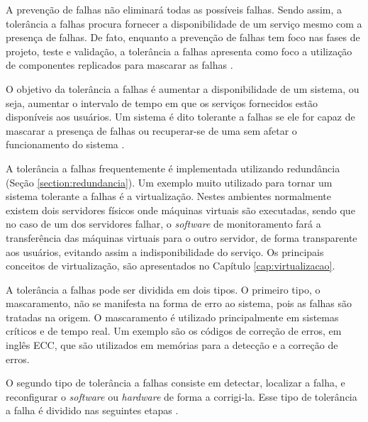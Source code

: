 A prevenção de falhas não eliminará todas as possíveis falhas. Sendo assim, a tolerância a falhas procura fornecer a disponibilidade de 
um serviço mesmo com a presença de falhas. De fato, enquanto a prevenção de falhas tem foco nas fases de projeto, teste e validação, a 
tolerância a falhas apresenta como foco a utilização de componentes replicados para mascarar as falhas \cite{pankaj1994}.

O objetivo da tolerância a falhas é aumentar a disponibilidade de um sistema, ou seja, aumentar o intervalo de tempo em que os serviços 
fornecidos estão disponíveis aos usuários. Um sistema é dito tolerante a falhas se ele for capaz de mascarar a presença de falhas ou recuperar-se 
de uma sem afetar o funcionamento do sistema \cite{pankaj1994}. %

A tolerância a falhas frequentemente é implementada utilizando redundância (Seção \ref{section:redundancia}). 
Um exemplo muito utilizado para tornar um sistema tolerante a falhas é a virtualização. Nestes ambientes normalmente existem dois servidores 
físicos onde máquinas virtuais são executadas, sendo que no caso de um dos servidores falhar, o \textit{software} de monitoramento fará a 
transferência das máquinas virtuais para o outro servidor, de forma transparente aos usuários, evitando assim a indisponibilidade do serviço. 
Os principais conceitos de virtualização, são apresentados no Capítulo \ref{cap:virtualizacao}.

A tolerância a falhas pode ser dividida em dois tipos. O primeiro tipo, o mascaramento, não se manifesta na forma de erro ao sistema, 
pois as falhas são tratadas na origem. O mascaramento é utilizado principalmente em sistemas críticos e de tempo real. Um exemplo são os 
códigos de correção de erros, em inglês \ac{ECC}, que são utilizados em memórias para a detecção e a correção de erros.

O segundo tipo de tolerância a falhas consiste em detectar, localizar a falha, e reconfigurar o \textit{software} ou \textit{hardware} de 
forma a corrigi-la. Esse tipo de tolerância a falha é dividido nas seguintes etapas \cite{weber2002}. 

